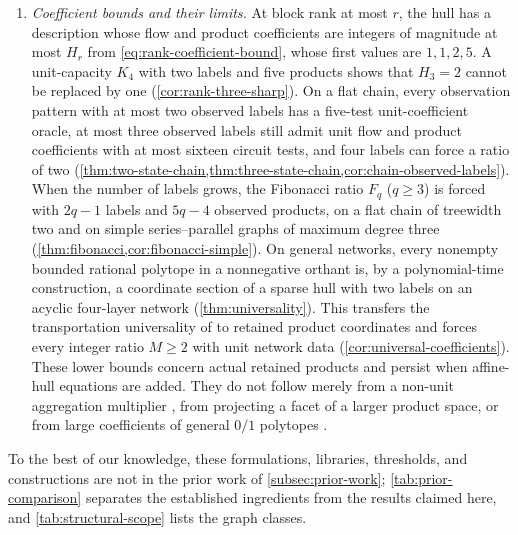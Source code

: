 \begin{enumerate}[leftmargin=*,itemsep=5pt]
\item \emph{Coefficient bounds and their limits.}
At block rank at most $r$, the hull has a description whose flow and
product coefficients are integers of magnitude at most $H_r$ from
\eqref{eq:rank-coefficient-bound}, whose first values are $1,1,2,5$. A unit-capacity $K_4$ with two labels and five products
shows that $H_3=2$ cannot be replaced by one (\cref{cor:rank-three-sharp}).
On a flat chain, every observation pattern with at most two observed labels
has a five-test unit-coefficient oracle, at most three observed labels still
admit unit flow and product coefficients with at most sixteen circuit tests,
and four labels can force a ratio of two
(\cref{thm:two-state-chain,thm:three-state-chain,cor:chain-observed-labels}).
When the number of labels grows, the Fibonacci ratio $F_q$ ($q\ge3$) is
forced with $2q-1$ labels and $5q-4$
observed products, on a flat chain of treewidth two and on simple
series--parallel graphs of maximum degree three
(\cref{thm:fibonacci,cor:fibonacci-simple}). On general networks, every
nonempty bounded rational polytope in a nonnegative orthant is, by a
polynomial-time construction, a coordinate section of a sparse hull with two
labels on an acyclic four-layer network (\cref{thm:universality}). This
transfers the transportation universality of \citet{DeLoeraOnn2006} to
retained product coordinates and forces every integer ratio $M\ge2$ with
unit network data (\cref{cor:universal-coefficients}). These lower bounds
concern actual retained products and persist when affine-hull equations are
added. They do not follow merely from a non-unit aggregation multiplier
\citep[Example~2]{KhademniaDavarnia2025}, from projecting a facet of a larger
product space, or from large coefficients of general $0/1$ polytopes
\citep{AlonVu1997}.
\end{enumerate}

To the best of our knowledge, these formulations, libraries, thresholds,
and constructions are not in the prior work of \cref{subsec:prior-work};
\cref{tab:prior-comparison} separates the established ingredients from the
results claimed here, and \cref{tab:structural-scope} lists the graph
classes.


